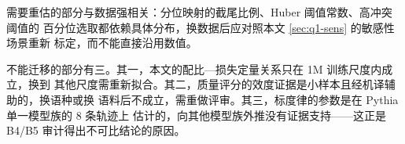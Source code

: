 \documentclass[bwprint]{gmcmthesis}
\numberwithin{equation}{section}
\numberwithin{figure}{section}
\numberwithin{table}{section}
\begin{document}
需要重估的部分与数据强相关：分位映射的截尾比例、Huber 阈值常数、高冲突阈值的
百分位选取都依赖具体分布，换数据后应对照本文 \ref{sec:q1-sens} 的敏感性场景重新
标定，而不能直接沿用数值。

不能迁移的部分有三。其一，本文的配比—损失定量关系只在 1M 训练尺度内成立，换到
其他尺度需重新拟合。其二，质量评分的效度证据是小样本且经机译辅助的，换语种或换
语料后不成立，需重做评审。其三，标度律的参数是在 Pythia 单一模型族的 8 条轨迹上
估计的，向其他模型族外推没有证据支持——这正是 B4/B5 审计得出不可比结论的原因。





\end{document}
